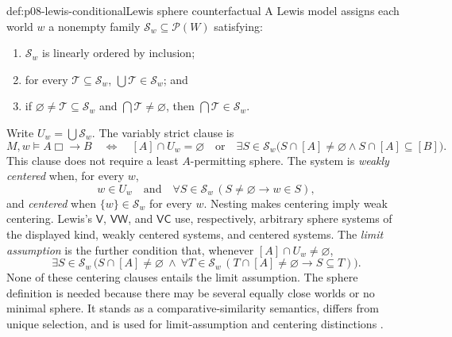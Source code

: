 \begin{hbdefinition}{def:p08-lewis-conditional}{Lewis sphere counterfactual}
A Lewis model assigns each world \(w\) a nonempty family
\(\mathcal S_w\subseteq\mathcal P(W)\) satisfying:
\begin{enumerate}
  \item \(\mathcal S_w\) is linearly ordered by inclusion;
  \item for every \(\mathcal T\subseteq\mathcal S_w\),
    \(\bigcup\mathcal T\in\mathcal S_w\); and
  \item if \(\varnothing\ne\mathcal T\subseteq\mathcal S_w\) and
    \(\bigcap\mathcal T\ne\varnothing\), then
    \(\bigcap\mathcal T\in\mathcal S_w\).
\end{enumerate}
Write \(U_w=\bigcup\mathcal S_w\).  The variably strict clause is
\[
 M,w\models A\Box\!\!\to B
 \quad\Longleftrightarrow\quad
 [A]\cap U_w=\varnothing
 \quad\text{or}\quad
 \exists S\in\mathcal S_w
 \bigl(S\cap[A]\ne\varnothing\land S\cap[A]\subseteq[B]\bigr).
\]
This clause does not require a least \(A\)-permitting sphere.  The system is
\emph{weakly centered} when, for every \(w\),
\[
 w\in U_w
 \quad\text{and}\quad
 \forall S\in\mathcal S_w\,
   (S\ne\varnothing\to w\in S),
\]
and \emph{centered} when
\(\{w\}\in\mathcal S_w\) for every \(w\).  Nesting makes centering imply weak
centering.  Lewis's \(\mathsf V\), \(\mathsf{VW}\), and \(\mathsf{VC}\)
use, respectively, arbitrary sphere systems of the displayed kind, weakly
centered systems, and centered systems.  The \emph{limit assumption} is the
further condition that, whenever \([A]\cap U_w\ne\varnothing\),
\[
 \exists S\in\mathcal S_w\,
 \bigl(S\cap[A]\ne\varnothing\ \land\
   \forall T\in\mathcal S_w\,
     (T\cap[A]\ne\varnothing\to S\subseteq T)\bigr).
\]
None of these centering clauses entails the limit assumption.  The sphere
definition is needed because there may be several equally close worlds or no
minimal sphere. It stands as a comparative-similarity semantics, differs from
unique selection, and is used for limit-assumption and centering distinctions
\cite{Lewis1973}.
\end{hbdefinition}

